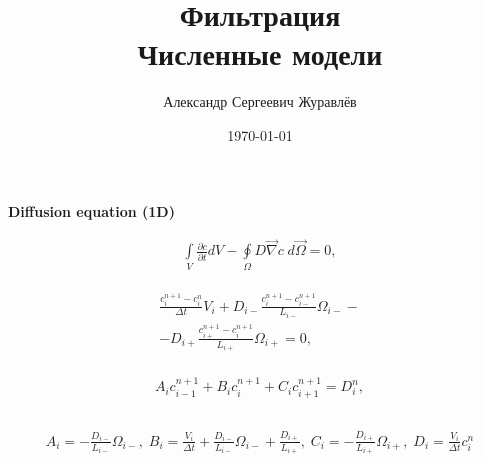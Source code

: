 \documentclass[a4paper,12pt,russian]{extreport}
\author{Александр Сергеевич Журавлёв}
\title{Фильтрация\\Численные модели}
\date{\today}
\begin{document}
\pagecolor{pageColor}
\color{fontColor}
\Russian
\printnomenclature[5em]

\begin{center}
{\large \textbf{Diffusion equation (1D)}}
\end{center}

\begin{eqnarray}
\label{eq:phys_D}
\int \limits_{V} \frac{\partial c}{\partial t} d V - \oint \limits_{\Omega} D \vec{\nabla}c \; d\vec{\Omega} = 0,
\end{eqnarray}

\begin{eqnarray}
\label{eq:num_D}
\begin{gathered}
\frac{c^{n+1}_{i} - c^{n}_{i}}{\Delta t} V_{i} +D_{i-}\frac{c^{n+1}_{i} - c^{n+1}_{i-}}{L_{i-}} \Omega_{i-} - \\
- D_{i+}\frac{c^{n+1}_{i+} - c^{n+1}_{i}}{L_{i+}} \Omega_{i+} = 0,
\end{gathered}
\end{eqnarray}

\begin{eqnarray}
\begin{gathered}
\label{eq:B_coeff}
A_i c_{i-1}^{n+1} + B_i c_{i}^{n+1} + C_i c_{i+1}^{n+1} = D_{i}^n, \\
\end{gathered}
\end{eqnarray}

\begin{eqnarray}
\begin{gathered}
\label{eq:coeff}
A_i = - \frac{D_{i-}}{L_{i-}} \Omega_{i-}, \;
B_i = \frac{V_{i}}{\Delta t} + \frac{D_{i-}}{L_{i-}} \Omega_{i-} + \frac{D_{i+}}{L_{i+}}, \;
C_i = - \frac{D_{i+}}{L_{i+}} \Omega_{i+}, \; 
D_i = \frac{V_{i}}{\Delta t} c_{i}^n
\end{gathered}
\end{eqnarray}
\end{document}
